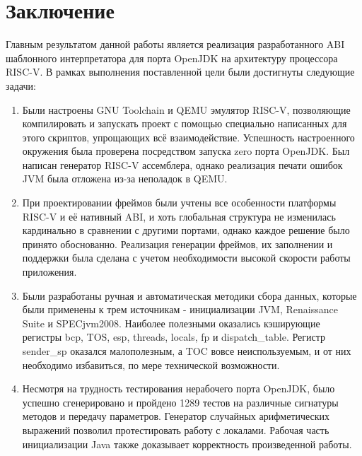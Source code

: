 \section*{Заключение}

Главным результатом данной работы является реализация разработанного ABI шаблонного интерпретатора для порта OpenJDK на архитектуру процессора RISC-V. В рамках выполнения поставленной цели были достигнуты следующие задачи:

\begin{enumerate}
    \item Были настроены GNU Toolchain и QEMU эмулятор RISC-V, позволяющие компилировать и запускать проект с помощью специально написанных для этого скриптов, упрощающих всё взаимодействие. Успешность настроенного окружения была проверена посредством запуска zero порта OpenJDK. Был написан генератор RISC-V ассемблера, однако реализация печати ошибок JVM была отложена из-за неполадок в QEMU.
    
    \item При проектировании фреймов были учтены все особенности платформы RISC-V и её нативный ABI, и хоть глобальная структура не изменилась кардинально в сравнении с другими портами, однако каждое решение было принято обоснованно. Реализация генерации фреймов, их заполнении и поддержки была сделана с учетом необходимости высокой скорости работы приложения.
    
    \item Были разработаны ручная и автоматическая методики сбора данных, которые были применены к трем источникам - инициализации JVM, Renaissance Suite и SPECjvm2008. Наиболее полезными оказались кэширующие регистры bcp, TOS, esp, threads, locals, fp и dispatch\_table. Регистр sender\_sp оказался малополезным, а TOC вовсе неиспользуемым, и от них необходимо избавиться, по мере технической возможности.
    
    \item Несмотря на трудность тестирования нерабочего порта OpenJDK, было успешно сгенерировано и пройдено 1289 тестов на различные сигнатуры методов и передачу параметров. Генератор случайных арифметических выражений позволил протестировать работу с локалами. Рабочая часть инициализации Java также доказывает корректность произведенной работы.
\end{enumerate}

